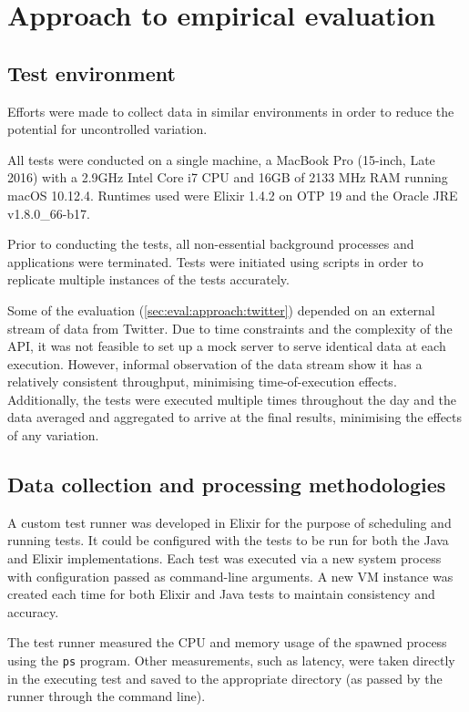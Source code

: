 \section{Approach to empirical evaluation}\label{sec:eval:approach}

\subsection{Test environment}\label{sec:eval:approach:environment}

Efforts were made to collect data in similar environments in order to reduce the potential for uncontrolled variation.

All tests were conducted on a single machine, a MacBook Pro (15-inch, Late 2016) with a 2.9GHz Intel Core i7 CPU and 16GB of 2133 MHz RAM running macOS 10.12.4.
Runtimes used were Elixir 1.4.2 on OTP 19 and the Oracle JRE v1.8.0\_66-b17.

Prior to conducting the tests, all non-essential background processes and applications were terminated.
Tests were initiated using scripts in order to replicate multiple instances of the tests accurately.

Some of the evaluation (\cref{sec:eval:approach:twitter}) depended on an external stream of data from Twitter.
Due to time constraints and the complexity of the API, it was not feasible to set up a mock server to serve identical data at each execution.
However, informal observation of the data stream show it has a relatively consistent throughput, minimising time-of-execution effects.
Additionally, the tests were executed multiple times throughout the day and the data averaged and aggregated to arrive at the final results, minimising the effects of any variation.

\subsection{Data collection and processing methodologies}\label{sec:eval:approach:collection}

A custom test runner was developed in Elixir for the purpose of scheduling and running tests.
It could be configured with the tests to be run for both the Java and Elixir implementations.
Each test was executed via a new system process with configuration passed as command-line arguments.
A new VM instance was created each time for both Elixir and Java tests to maintain consistency and accuracy.

The test runner measured the CPU and memory usage of the spawned process using the \verb|ps| program.
Other measurements, such as latency, were taken directly in the executing test and saved to the appropriate directory (as passed by the runner through the command line).

